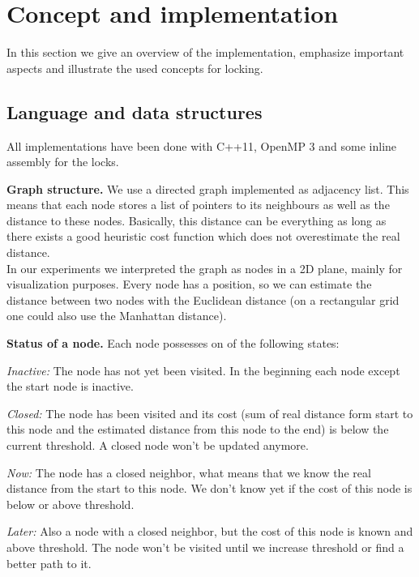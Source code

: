 \documentclass[letterpaper]{article}
\newcommand{\mypar}[1]{{\bf #1.}}
\begin{document}
\section{Concept and implementation}\label{sec:impl}

In this section we give an overview of the implementation, emphasize important aspects and illustrate the used concepts for locking. 

\subsection{Language and data structures}\label{ssec:lang}

All implementations have been done with C++11, OpenMP 3 and some inline assembly for the locks.

\mypar{Graph structure}
We use a directed graph implemented as adjacency list. This means that each node stores a list of pointers to its neighbours as well as the distance to these nodes. Basically, this distance can be everything as long as there exists a good heuristic cost function which does not overestimate the real distance. \\
In our experiments we interpreted the graph as nodes in a 2D plane, mainly for visualization purposes. Every node has a position, so we can estimate the distance between two nodes with the Euclidean distance (on a rectangular grid one could also use the Manhattan distance).

\mypar{Status of a node} Each node possesses on of the following states:
\begin{compactitem}
\item \textit{Inactive:} The node has not yet been visited. In the beginning each node except the start node is inactive.
\item \textit{Closed:} The node has been visited and its cost (sum of real distance form start to this node and the estimated distance from this node to the end) is below the current threshold. A closed node won't be updated anymore.
\item \textit{Now:} The node has a closed neighbor, what means that we know the real distance from the start to this node. We don't know yet if the cost of this node is below or above threshold.
\item \textit{Later:} Also a node with a closed neighbor, but the cost of this node is known and above threshold. The node won't be visited until we increase threshold or find a better path to it.
\end{compactitem}
\end{document}
